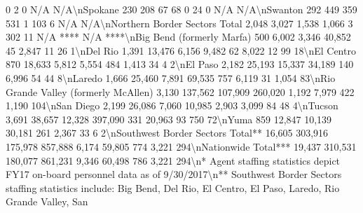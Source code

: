 \documentclass[
  12pt,
  openany]{book}
\newenvironment{Shaded}{\begin{snugshade}}{\end{snugshade}}
\begin{document}
\begin{Shaded}
\begin{Highlighting}[]
       0                2               0              N/A      N/A\textbackslash{}nSpokane                                           230                208                       67                     68                 0               24               0              N/A      N/A\textbackslash{}nSwanton                                           292               449                       359                    531                 1               103               6             N/A      N/A\textbackslash{}nNorthern Border Sectors Total                    2,048             3,027                     1,538                  1,066                3               302              11        N/A ****    N/A   ****\textbackslash{}nBig Bend (formerly Marfa)                         500              6,002                     3,346                  40,852              45              2,847             11             26       1\textbackslash{}nDel Rio                                          1,391             13,476                    6,156                  9,482               62              8,022             12             99       18\textbackslash{}nEl Centro                                         870              18,633                    5,812                  5,554              484              1,413             34             4        2\textbackslash{}nEl Paso                                          2,182             25,193                   15,337                  34,189             140              6,996             54             44       8\textbackslash{}nLaredo                                           1,666             25,460                    7,891                  69,535             757              6,119             31            1,054     83\textbackslash{}nRio Grande Valley (formerly McAllen)             3,130            137,562                  107,909                 260,020            1,192             7,979            422            1,190    104\textbackslash{}nSan Diego                                        2,199             26,086                    7,060                  10,985            2,903             3,099             84             48       4\textbackslash{}nTucson                                           3,691             38,657                   12,328                 397,090             331             20,963             93            750       72\textbackslash{}nYuma                                              859              12,847                   10,139                  30,181             261              2,367             33             6        2\textbackslash{}nSouthwest Border Sectors Total**                16,605            303,916                  175,978                 857,888            6,174            59,805            774            3,221    294\textbackslash{}nNationwide Total***                             19,437            310,531                  180,077                 861,231            9,346            60,498            786            3,221    294\textbackslash{}n* Agent staffing statistics depict FY17 on{-}board personnel data as of 9/30/2017\textbackslash{}n** Southwest Border Sectors staffing statistics include: Big Bend, Del Rio, El Centro, El Paso, Laredo, Rio Grande Valley, San 
\end{Highlighting}
\end{Shaded}
\end{document}
